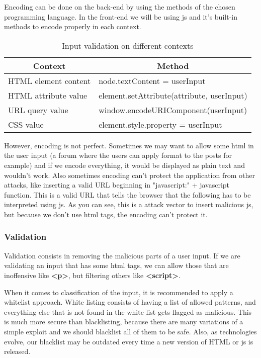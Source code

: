 Encoding can be done on the back-end by using the methods of the chosen programming language. In the front-end we will be using js and it's built-in methods to encode properly in each context.

\begin{table}[]
	\centering
	\caption{Input validation on different contexts}
	\label{my-label}
	\begin{tabular}{|l|l|}
		\hline
		\multicolumn{1}{|c|}{\textbf{Context}} & \multicolumn{1}{c|}{\textbf{Method}}                           \\ \hline
		HTML element content                   & node.textContent = userInput 									\\ \hline
		HTML attribute value                   & element.setAttribute(attribute, userInput)                   	\\ \hline
		URL query value                        & window.encodeURIComponent(userInput)                           \\ \hline
		CSS value                              & element.style.property = userInput                             \\ \hline
	\end{tabular}
\end{table}

However, encoding is not perfect. Sometimes we may want to allow some html in the user input (a forum where the users can apply format to the posts for example) and if we encode everything, it would be displayed as plain text and wouldn't work. Also sometimes encoding can't protect the application from other attacks, like inserting a valid URL beginning in "javascript:" + javascript function. This is a valid URL that tells the browser that the following has to be interpreted using js. As you can see, this is a attack vector to insert malicious js, but because we don't use html tags, the encoding can't protect it.

\subsubsection{Validation}
Validation consists in removing the malicious parts of a user input. If we are validating an input that has some html tags, we can allow those that are inoffensive like\textbf{ <p>}, but filtering others like \textbf{<script>}.

When it comes to classification of the input, it is recommended to apply a whitelist approach. White listing consists of having a list of allowed patterns, and everything else that is not found in the white list gets flagged as malicious. This is much more secure than blacklisting, because there are many variations of a simple exploit and we should blacklist all of them to be safe. Also, as technologies evolve, our blacklist may be outdated every time a new version of HTML or js is released. 

